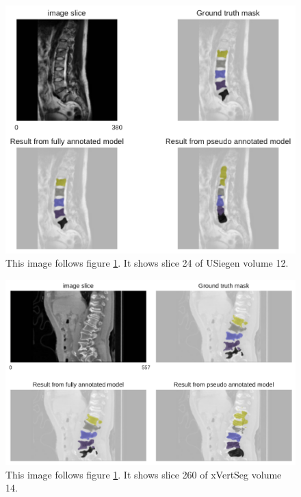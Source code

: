 \begin{figure}
    \centering
        \includegraphics[width=.99\textwidth]{images/fullvsPseudo_USiegen_012_024.pdf}
    \caption{This image follows figure \ref{fig:fullvsPseudo}. It shows slice 24 of USiegen volume 12. 
    \protect}
\end{figure}
\begin{figure}
    \centering
        \includegraphics[width=.99\textwidth]{images/fullvsPseudo_xVertSeg_014_260.pdf}
    \caption{This image follows figure \ref{fig:fullvsPseudo}. It shows slice 260 of xVertSeg volume 14. 
    \protect
    \label{fig:fullvsPseudo}}
\end{figure}


